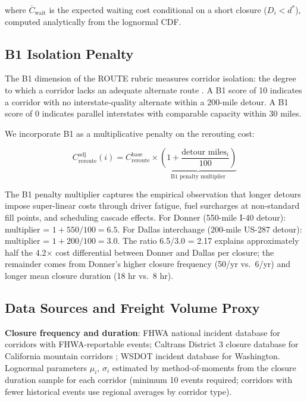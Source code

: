 where $\overline{C}_\text{wait}$ is the expected waiting cost conditional on a short
closure ($D_i < d^*$), computed analytically from the lognormal CDF.

\subsection{B1 Isolation Penalty}

The B1 dimension of the ROUTE rubric measures corridor isolation: the degree to which
a corridor lacks an adequate alternate route \citep{ROUTE_B1}. A B1 score of 10
indicates a corridor with no interstate-quality alternate within a 200-mile detour.
A B1 score of 0 indicates parallel interstates with comparable capacity within 30 miles.

We incorporate B1 as a multiplicative penalty on the rerouting cost:

\begin{equation}
C_\text{reroute}^{\text{adj}}(i) = C_\text{reroute}^{\text{base}} \times
\underbrace{\left(1 + \frac{\text{detour miles}_i}{100}\right)}_{\text{B1 penalty multiplier}}
\end{equation}

The B1 penalty multiplier captures the empirical observation that longer detours impose
super-linear costs through driver fatigue, fuel surcharges at non-standard fill points,
and scheduling cascade effects. For Donner (550-mile I-40 detour): multiplier = $1 +
550/100 = 6.5$. For Dallas interchange (200-mile US-287 detour): multiplier = $1 + 200/100
= 3.0$. The ratio 6.5/3.0 = 2.17 explains approximately half the 4.2$\times$ cost
differential between Donner and Dallas per closure; the remainder comes from Donner's
higher closure frequency (50/yr vs.\ 6/yr) and longer mean closure duration (18 hr
vs.\ 8 hr).

\subsection{Data Sources and Freight Volume Proxy}

\textbf{Closure frequency and duration}: FHWA national incident database \citep{FHWA_incident2022}
for corridors with FHWA-reportable events; Caltrans District 3 closure database for
California mountain corridors \citep{Caltrans2023}; WSDOT incident database for Washington.
Lognormal parameters $\mu_i$, $\sigma_i$ estimated by method-of-moments from the closure
duration sample for each corridor (minimum 10 events required; corridors with fewer
historical events use regional averages by corridor type).

